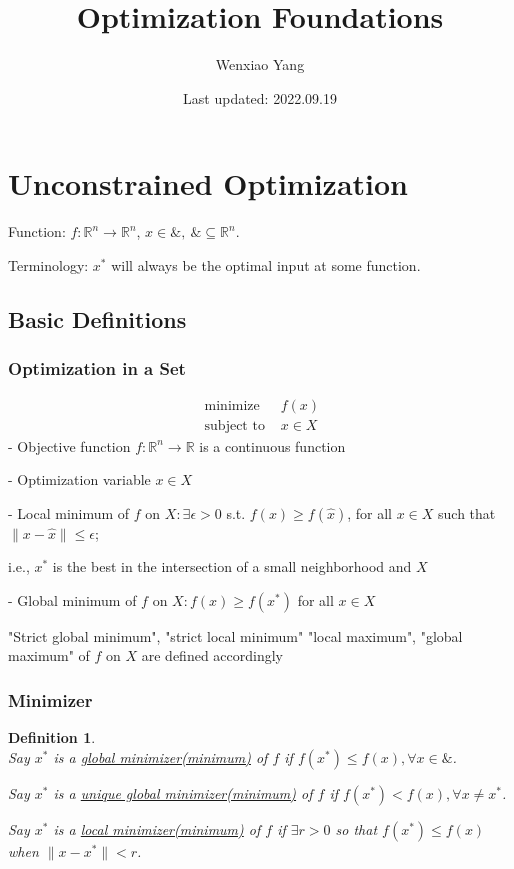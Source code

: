 \documentclass[11pt,a4paper]{article}
\title{Optimization Foundations}
\author[*]{Wenxiao Yang}
\affil[*]{Department of Mathematics, University of Illinois at Urbana-Champaign}
\date{Last updated: 2022.09.19}
\newtheorem{definition}{Definition}
\begin{document}
\maketitle
\tableofcontents
\newpage

\section{Unconstrained Optimization}
Function: $f:\mathbb{R}^n \rightarrow	\mathbb{R}^n$, $x\in \&,\ \&\subseteq \mathbb{R}^n$.

Terminology: $x^*$ will always be the optimal input at some function.

\subsection{Basic Definitions}
\subsubsection{Optimization in a Set}
$$\begin{array}{ll}\text { minimize } & f(x) \\ \text { subject to } & x \in X\end{array}$$
- Objective function $f: \mathbb{R}^{n} \rightarrow \mathbb{R}$ is a continuous function

- Optimization variable $x \in X$

- Local minimum of $f$ on $X: \exists \epsilon>0$ s.t. $f(x) \geq f(\hat{x})$, for all $x \in X$ such that $\|x-\hat{x}\| \leq \epsilon$;

i.e., $x^{*}$ is the best in the intersection of a small neighborhood and $X$

- Global minimum of $f$ on $X: f(x) \geq f\left(x^{*}\right)$ for all $x \in X$

"Strict global minimum", "strict local minimum" "local maximum", "global maximum" of $f$ on $X$ are defined accordingly

\subsubsection{Minimizer}
\begin{definition}
    \quad\\
    Say $x^*$ is a \underline{global minimizer(minimum)} of $f$ if $f(x^*)\leq f(x), \forall x\in \&$.

    Say $x^*$ is a \underline{unique global minimizer(minimum)} of $f$ if $f(x^*)< f(x), \forall x\neq x^*$.

    Say $x^*$ is a \underline{local minimizer(minimum)} of $f$ if $\exists r>0$ so that $f(x^*)\leq f(x)$ when $\|x-x^*\|<r$.
\end{definition}
\end{document}
